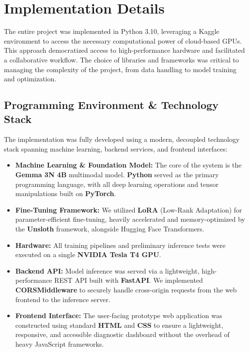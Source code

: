 \documentclass[11pt]{article}
\begin{document}
\section{Implementation Details}
The entire project was implemented in Python 3.10, leveraging a Kaggle environment to access the necessary computational power of cloud-based GPUs. This approach democratized access to high-performance hardware and facilitated a collaborative workflow. The choice of libraries and frameworks was critical to managing the complexity of the project, from data handling to model training and optimization.

\subsection{Programming Environment \& Technology Stack}
The implementation was fully developed using a modern, decoupled technology stack spanning machine learning, backend services, and frontend interfaces:
\begin{itemize}
    \item \textbf{Machine Learning \& Foundation Model:} The core of the system is the \textbf{Gemma 3N 4B} multimodal model. \textbf{Python} served as the primary programming language, with all deep learning operations and tensor manipulations built on \textbf{PyTorch}.
    \item \textbf{Fine-Tuning Framework:} We utilized \textbf{LoRA} (Low-Rank Adaptation) for parameter-efficient fine-tuning, heavily accelerated and memory-optimized by the \textbf{Unsloth} framework, alongside Hugging Face Transformers.
    \item \textbf{Hardware:} All training pipelines and preliminary inference tests were executed on a single \textbf{NVIDIA Tesla T4 GPU}.
    \item \textbf{Backend API:} Model inference was served via a lightweight, high-performance REST API built with \textbf{FastAPI}. We implemented \textbf{CORSMiddleware} to securely handle cross-origin requests from the web frontend to the inference server.
    \item \textbf{Frontend Interface:} The user-facing prototype web application was constructed using standard \textbf{HTML} and \textbf{CSS} to ensure a lightweight, responsive, and accessible diagnostic dashboard without the overhead of heavy JavaScript frameworks.
\end{itemize}
\end{document}
